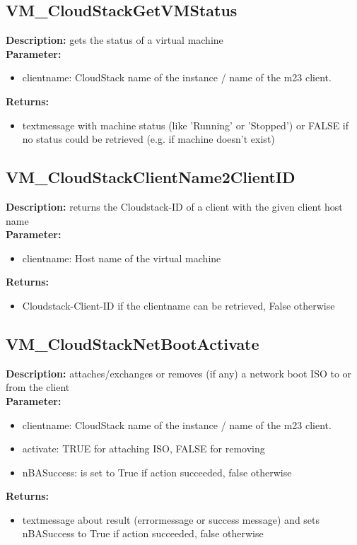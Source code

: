 \subsection{VM\_CloudStackGetVMStatus}
\textbf{Description:} gets the status of a virtual machine\\
\textbf{Parameter:}
\begin{itemize}
\item clientname: CloudStack name of the instance / name of the m23 client.
\end{itemize}
\textbf{Returns:}
\begin{itemize}
\item textmessage with machine status (like 'Running' or 'Stopped') or FALSE if no status could be retrieved (e.g. if machine doesn't exist)
\end{itemize}

\subsection{VM\_CloudStackClientName2ClientID}
\textbf{Description:} returns the Cloudstack-ID of a client with the given client host name\\
\textbf{Parameter:}
\begin{itemize}
\item clientname: Host name of the virtual machine
\end{itemize}
\textbf{Returns:}
\begin{itemize}
\item Cloudstack-Client-ID if the clientname can be retrieved, False otherwise 
\end{itemize}

\subsection{VM\_CloudStackNetBootActivate}
\textbf{Description:} attaches/exchanges or removes (if any) a network boot ISO to or from the client\\
\textbf{Parameter:}
\begin{itemize}
\item clientname: CloudStack name of the instance / name of the m23 client.
\item activate: TRUE for attaching ISO, FALSE for removing
\item nBASuccess: is set to True if action succeeded, false otherwise
\end{itemize}
\textbf{Returns:}
\begin{itemize}
\item textmessage about result (errormessage or success message) and sets nBASuccess to True if action succeeded, false otherwise
\end{itemize}

